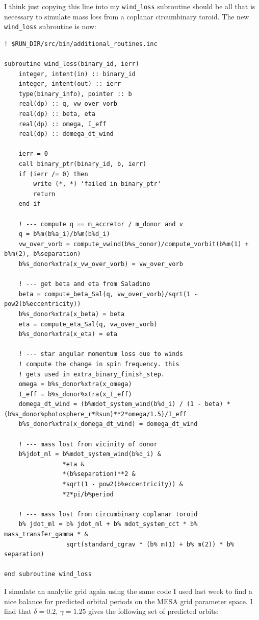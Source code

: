 \documentclass[a4paper,10pt]{article}
\begin{document}
I think just copying this line into my \lstinline[style=output, breaklines=true]|wind_loss| subroutine should be all that is necessary to simulate mass loss from a coplanar circumbinary toroid. The new \lstinline[style=output, breaklines=true]|wind_loss| subroutine is now:
\begin{verbatim}
! $RUN_DIR/src/bin/additional_routines.inc

subroutine wind_loss(binary_id, ierr)
    integer, intent(in) :: binary_id
    integer, intent(out) :: ierr
    type(binary_info), pointer :: b
    real(dp) :: q, vw_over_vorb
    real(dp) :: beta, eta
    real(dp) :: omega, I_eff
    real(dp) :: domega_dt_wind

    ierr = 0
    call binary_ptr(binary_id, b, ierr)
    if (ierr /= 0) then
        write (*, *) 'failed in binary_ptr'
        return
    end if

    ! --- compute q == m_accretor / m_donor and v
    q = b%m(b%a_i)/b%m(b%d_i)
    vw_over_vorb = compute_vwind(b%s_donor)/compute_vorbit(b%m(1) + b%m(2), b%separation)
    b%s_donor%xtra(x_vw_over_vorb) = vw_over_vorb

    ! --- get beta and eta from Saladino
    beta = compute_beta_Sal(q, vw_over_vorb)/sqrt(1 - pow2(b%eccentricity))
    b%s_donor%xtra(x_beta) = beta
    eta = compute_eta_Sal(q, vw_over_vorb)
    b%s_donor%xtra(x_eta) = eta

    ! --- star angular momentum loss due to winds
    ! compute the change in spin frequency. this
    ! gets used in extra_binary_finish_step.
    omega = b%s_donor%xtra(x_omega)
    I_eff = b%s_donor%xtra(x_I_eff)
    domega_dt_wind = (b%mdot_system_wind(b%d_i) / (1 - beta) *(b%s_donor%photosphere_r*Rsun)**2*omega/1.5)/I_eff
    b%s_donor%xtra(x_domega_dt_wind) = domega_dt_wind

    ! --- mass lost from vicinity of donor
    b%jdot_ml = b%mdot_system_wind(b%d_i) &
                *eta &
                *(b%separation)**2 &
                *sqrt(1 - pow2(b%eccentricity)) &
                *2*pi/b%period

    ! --- mass lost from circumbinary coplanar toroid
    b% jdot_ml = b% jdot_ml + b% mdot_system_cct * b% mass_transfer_gamma * &
                 sqrt(standard_cgrav * (b% m(1) + b% m(2)) * b% separation)

end subroutine wind_loss
\end{verbatim}

I simulate an analytic grid again using the same code I used last week to find a nice balance for predicted orbital periods on the MESA grid parameter space. I find that \(\delta =0.2\), \(\gamma =1.25\) gives the following set of predicted orbits:
\end{document}
